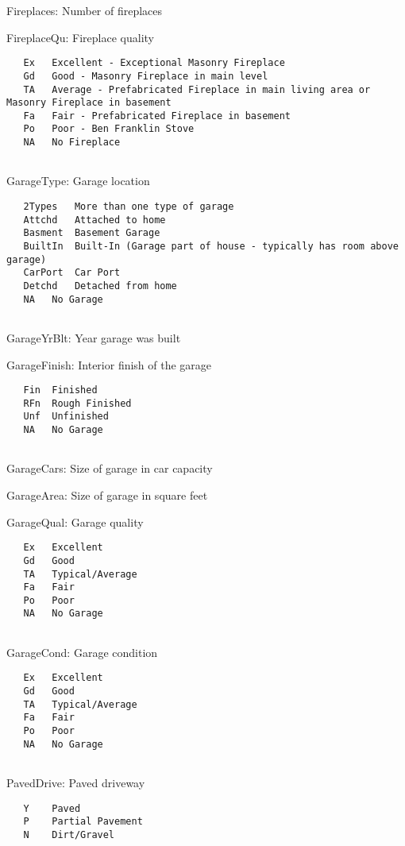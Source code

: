 \documentclass[]{article}
\begin{document}
Fireplaces: Number of fireplaces

FireplaceQu: Fireplace quality

\begin{verbatim}
   Ex   Excellent - Exceptional Masonry Fireplace
   Gd   Good - Masonry Fireplace in main level
   TA   Average - Prefabricated Fireplace in main living area or Masonry Fireplace in basement
   Fa   Fair - Prefabricated Fireplace in basement
   Po   Poor - Ben Franklin Stove
   NA   No Fireplace
    
\end{verbatim}

GarageType: Garage location

\begin{verbatim}
   2Types   More than one type of garage
   Attchd   Attached to home
   Basment  Basement Garage
   BuiltIn  Built-In (Garage part of house - typically has room above garage)
   CarPort  Car Port
   Detchd   Detached from home
   NA   No Garage
    
\end{verbatim}

GarageYrBlt: Year garage was built

GarageFinish: Interior finish of the garage

\begin{verbatim}
   Fin  Finished
   RFn  Rough Finished  
   Unf  Unfinished
   NA   No Garage
    
\end{verbatim}

GarageCars: Size of garage in car capacity

GarageArea: Size of garage in square feet

GarageQual: Garage quality

\begin{verbatim}
   Ex   Excellent
   Gd   Good
   TA   Typical/Average
   Fa   Fair
   Po   Poor
   NA   No Garage
    
\end{verbatim}

GarageCond: Garage condition

\begin{verbatim}
   Ex   Excellent
   Gd   Good
   TA   Typical/Average
   Fa   Fair
   Po   Poor
   NA   No Garage
    
\end{verbatim}

PavedDrive: Paved driveway

\begin{verbatim}
   Y    Paved 
   P    Partial Pavement
   N    Dirt/Gravel
    
\end{verbatim}
\end{document}
